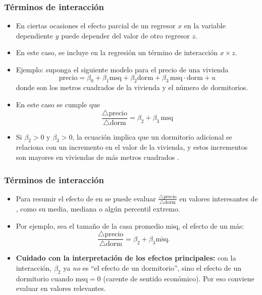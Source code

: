 \documentclass{beamer}
\begin{document}
\begin{frame}[shrink=10, t]
\frametitle{Términos de interacción}

\begin{itemize}
    \item En ciertas ocasiones el efecto parcial de un regresor \(x\) en la variable dependiente \(y\) puede depender del valor de otro regresor \(z\).
    \item En este caso, se incluye en la regresión un término de interacción \(x \times z\).
    \item Ejemplo: suponga el siguiente modelo para el precio de una vivienda
    \[
    \text{precio} = \beta_0 + \beta_1\text{msq} + \beta_2\text{dorm} + \beta_3\,\text{msq} \cdot \text{dorm} + u
    \]
    donde  son los metros cuadrados de la vivienda y  el número de dormitorios.
    \item En este caso se cumple que
    \[
    \frac{\triangle \text{precio}}{\triangle \text{dorm}} = \beta_2 + \beta_3\,\text{msq}
    \]
    \item Si \(\beta_2 > 0\) y \(\beta_3 > 0\), la ecuación implica que un dormitorio adicional se relaciona con un incremento en el valor de la vivienda, y estos incrementos son mayores en viviendas de más metros cuadrados .
\end{itemize}

\end{frame}



\begin{frame}
\frametitle{Términos de interacción}

\begin{itemize}
    \item Para resumir el efecto de  en  se puede evaluar \(\frac{\triangle \text{precio}}{\triangle \text{dorm}}\) en valores interesantes de , como su media, mediana o algún percentil extremo.
    \item Por ejemplo, sea el tamaño de la casa promedio \(\bar{\text{msq}}\), el efecto de un  más:
    \[
    \frac{\triangle \text{precio}}{\triangle \text{dorm}} = \beta_2 + \beta_3\bar{\text{msq}}. \quad
    \]
    \item \textbf{Cuidado con la interpretación de los efectos principales:} con la interacción, $\beta_2$ ya \emph{no} es ``el efecto de un dormitorio'', sino el efecto de un dormitorio cuando $\text{msq}=0$ (carente de sentido económico). Por eso conviene evaluar en valores relevantes.
\end{itemize}

\end{frame}
\end{document}
